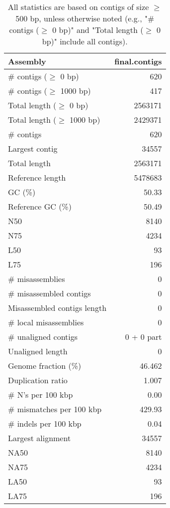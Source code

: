 \documentclass[12pt,a4paper]{article}
\begin{document}
\begin{table}[ht]
\begin{center}
\caption{All statistics are based on contigs of size $\geq$ 500 bp, unless otherwise noted (e.g., "\# contigs ($\geq$ 0 bp)" and "Total length ($\geq$ 0 bp)" include all contigs).}
\begin{tabular}{|l*{1}{|r}|}
\hline
Assembly & final.contigs \\ \hline
\# contigs ($\geq$ 0 bp) & 620 \\ \hline
\# contigs ($\geq$ 1000 bp) & 417 \\ \hline
Total length ($\geq$ 0 bp) & 2563171 \\ \hline
Total length ($\geq$ 1000 bp) & 2429371 \\ \hline
\# contigs & 620 \\ \hline
Largest contig & 34557 \\ \hline
Total length & 2563171 \\ \hline
Reference length & 5478683 \\ \hline
GC (\%) & 50.33 \\ \hline
Reference GC (\%) & 50.49 \\ \hline
N50 & 8140 \\ \hline
N75 & 4234 \\ \hline
L50 & 93 \\ \hline
L75 & 196 \\ \hline
\# misassemblies & 0 \\ \hline
\# misassembled contigs & 0 \\ \hline
Misassembled contigs length & 0 \\ \hline
\# local misassemblies & 0 \\ \hline
\# unaligned contigs & 0 + 0 part \\ \hline
Unaligned length & 0 \\ \hline
Genome fraction (\%) & 46.462 \\ \hline
Duplication ratio & 1.007 \\ \hline
\# N's per 100 kbp & 0.00 \\ \hline
\# mismatches per 100 kbp & 429.93 \\ \hline
\# indels per 100 kbp & 0.04 \\ \hline
Largest alignment & 34557 \\ \hline
NA50 & 8140 \\ \hline
NA75 & 4234 \\ \hline
LA50 & 93 \\ \hline
LA75 & 196 \\ \hline
\end{tabular}
\end{center}
\end{table}
\end{document}
